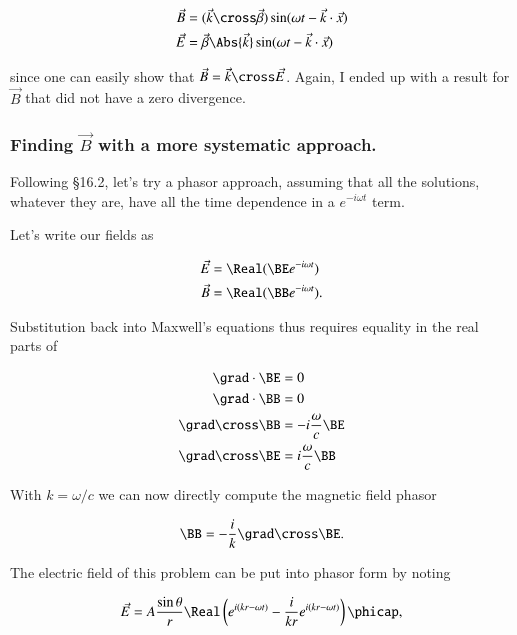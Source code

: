 \begin{align}\label{eqn:relElectroDynProblemSet4:480}
\vec{B} &= (\vec{k} \cross \vec{\beta}) \sin(\omega t - \vec{k} \cdot \vec{x}) \\
\vec{E} &= \vec{\beta} \Abs{\vec{k}} \sin(\omega t - \vec{k} \cdot \vec{x})
\end{align}

since one can easily show that $\vec{B} = \vec{k} \cross \vec{E}$.  Again, I ended up with a result for $\vec{B}$ that did not have a zero divergence.

\subsubsection{Finding $\vec{B}$ with a more systematic approach.}

Following \citep{jackson1975cew} \S 16.2, let's try a phasor approach, assuming that all the solutions, whatever they are, have all the time dependence in a $e^{-i\omega t}$ term.

Let's write our fields as

\begin{align}\label{eqn:relElectroDynProblemSet4:500}
\vec{E} &= \Real (\BE e^{-i \omega t}) \\
\vec{B} &= \Real (\BB e^{-i \omega t}).
\end{align}

Substitution back into Maxwell's equations thus requires equality in the real parts of

\begin{align}\label{eqn:relElectroDynProblemSet4:520}
\grad \cdot \BE &= 0 \\
\grad \cdot \BB &= 0 \\
\grad \cross \BB &= - i \frac{\omega}{c} \BE \\
\grad \cross \BE &= i \frac{\omega}{c} \BB
\end{align}

With $k = \omega/c$ we can now directly compute the magnetic field phasor

\begin{equation}\label{eqn:relElectroDynProblemSet4:540}
\BB = -\frac{i}{k} \grad \cross \BE.
\end{equation}

The electric field of this problem can be put into phasor form by noting

\begin{equation}\label{eqn:relElectroDynProblemSet4:560}
\vec{E} = A \frac{\sin\theta}{r} \Real \left( e^{i (k r - \omega t)} - \frac{i}{k r} e^{i(k r - \omega t)} \right) \phicap,
\end{equation}

